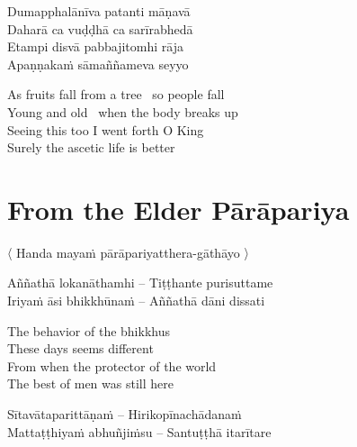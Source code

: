 \begin{twochants}
  Dumapphalānīva patanti māṇavā\\
  Daharā ca vuḍḍhā ca sarīrabhedā\\
  Etampi disvā pabbajitomhi rāja\\
  Apaṇṇakaṁ sāmaññameva seyyo
\end{twochants}

\begin{english-verses}
  As fruits fall from a tree \breathmark\ so people fall\\
  Young and old \breathmark\ when the body breaks up\\
  Seeing this too I went forth O King\\
  Surely the ascetic life is better
\end{english-verses}

\suttaRef{[Thag 16.4 / MN 82]}


\section{From the Elder Pārāpariya}
\label{parapariya}

\begin{leader}
  〈 Handa mayaṁ pārāpariyatthera-gāthāyo 〉

\end{leader}

\begin{twochants}
  Aññathā lokanāthamhi – Tiṭṭhante purisuttame\\
  Iriyaṁ āsi bhikkhūnaṁ – Aññathā dāni dissati\\
\end{twochants}

\begin{english-verses}
  The behavior of the bhikkhus\\
  These days seems different\\
  From when the protector of the world\\
  The best of men was still here
\end{english-verses}

\begin{twochants}
  Sītavātaparittāṇaṁ – Hirikopīnachādanaṁ\\
  Mattaṭṭhiyaṁ abhuñjiṁsu – Santuṭṭhā itarītare\\
\end{twochants}

